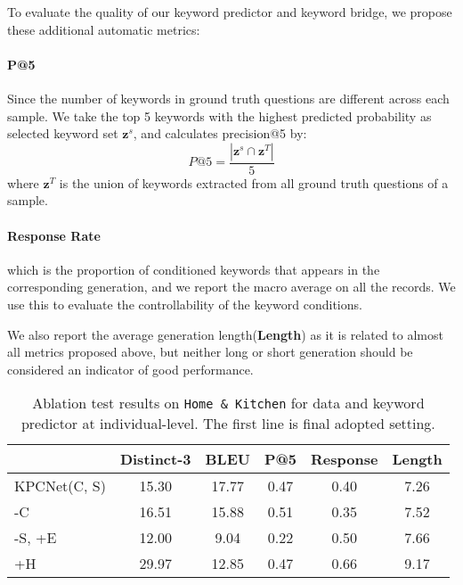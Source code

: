 To evaluate the quality of our keyword predictor and keyword bridge, we propose these additional automatic metrics:
\paragraph{P@5} Since the number of keywords in ground truth questions are different across each sample. We take the top 5 keywords with the highest predicted probability as selected keyword set $\mathbf{z}^s$, and calculates precision@5 by:
\begin{equation}
  P@5 = \frac{|\mathbf{z}^s \cap \mathbf{z}^T|}{5}
\end{equation}
where $\mathbf{z}^T$ is the union of keywords extracted from all ground truth questions of a sample.

\paragraph{Response Rate} which is the proportion of conditioned keywords that appears in the corresponding generation, and we report the macro average on all the records. We use this to evaluate the controllability of the keyword conditions.

We also report the average generation length(\textbf{Length}) as it is related to almost all metrics proposed above, but neither long or short generation should be considered an indicator of good performance.


\begin{table}[htbp]
  \centering
\begin{tabular}{l|ccccc}
\hline
{} & Distinct-3 & BLEU & P@5 & Response & Length \\
\hline
KPCNet(C, S) & 15.30 & 17.77 & 0.47 & 0.40 & 7.26 \\
-C & 16.51 & 15.88 & 0.51 & 0.35 & 7.52 \\
-S, +E & 12.00 & 9.04 & 0.22 & 0.50 & 7.66 \\
+H & 29.97 & 12.85 & 0.47 & 0.66 & 9.17 \\
\hline
\end{tabular}
\caption{\label{table:ablation1} Ablation test results on \texttt{Home \& Kitchen} for data and keyword predictor at individual-level. The first line is final adopted setting.}
\end{table}


